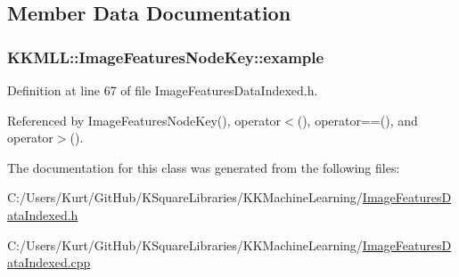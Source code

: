 \subsection{Member Data Documentation}
\subsubsection[{\texorpdfstring{example}{example}}]{ K\+K\+M\+L\+L\+::\+Image\+Features\+Node\+Key\+::example}\hypertarget{class_k_k_m_l_l_1_1_image_features_node_key_a5640af48690c6d775da5be786799d506}{}\label{class_k_k_m_l_l_1_1_image_features_node_key_a5640af48690c6d775da5be786799d506}


Definition at line 67 of file Image\+Features\+Data\+Indexed.\+h.



Referenced by Image\+Features\+Node\+Key(), operator$<$(), operator==(), and operator$>$().



The documentation for this class was generated from the following files\+:\begin{DoxyCompactItemize}
\item 
C\+:/\+Users/\+Kurt/\+Git\+Hub/\+K\+Square\+Libraries/\+K\+K\+Machine\+Learning/\hyperlink{_image_features_data_indexed_8h}{Image\+Features\+Data\+Indexed.\+h}\item 
C\+:/\+Users/\+Kurt/\+Git\+Hub/\+K\+Square\+Libraries/\+K\+K\+Machine\+Learning/\hyperlink{_image_features_data_indexed_8cpp}{Image\+Features\+Data\+Indexed.\+cpp}\end{DoxyCompactItemize}
